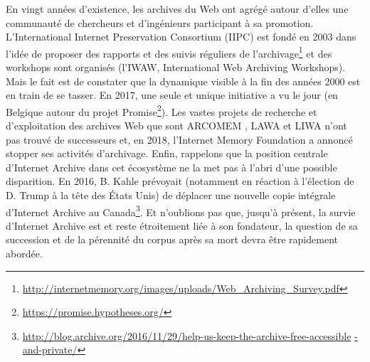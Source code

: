 \documentclass[symmetric,justified,marginals=raggedouter]{tufte-book}
\begin{document}
\noindent En vingt années d'existence, les archives du Web ont agrégé autour d'elles une communauté de chercheurs et d'ingénieurs participant à sa promotion. L'International Internet Preservation Consortium (IIPC) est fondé en 2003 dans l'idée de proposer des rapports et des suivis réguliers de l'archivage\footnote{\url{http://internetmemory.org/images/uploads/Web\_Archiving\_Survey.pdf}} et des workshops sont organisés (l'IWAW, International Web Archiving Workshops). Mais le fait est de constater que la dynamique visible à la fin des années 2000 est en train de se tasser. En 2017, une seule et unique initiative a vu le jour (en Belgique autour du projet Promise\footnote{\url{https://promise.hypotheses.org/}}). Les vastes projets de recherche et d'exploitation des archives Web que sont ARCOMEM \citep{risse_arcomem_2014}, LAWA \citep{spaniol_tracking_2012} et LIWA \citep{denev_sharc:_2009} n'ont pas trouvé de successeurs et, en 2018, l'Internet Memory Foundation a annoncé stopper ses activités d'archivage. Enfin, rappelons que la position centrale d'Internet Archive dans cet écosystème ne la met pas à l'abri d'une possible disparition. En 2016, B. Kahle prévoyait (notamment en réaction à l'élection de D. Trump à la tête des États Unis) de déplacer une nouvelle copie intégrale d'Internet Archive au Canada\footnote{\url{http://blog.archive.org/2016/11/29/help-us-keep-the-archive-free-accessible} \url{-and-private/}}. Et n'oublions pas que, jusqu'à présent, la survie d'Internet Archive est et reste étroitement liée à son fondateur, la question de sa succession et de la pérennité du corpus après sa mort devra être rapidement abordée.  
\end{document}
